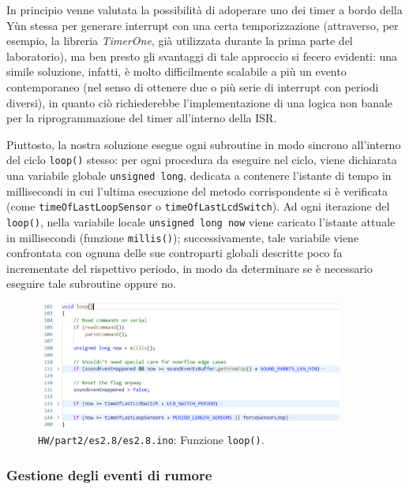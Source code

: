 \documentclass[12pt,a4paper]{article}
\begin{document}
In principio venne valutata la possibilità di adoperare uno dei timer a bordo della Yùn stessa per generare interrupt con una certa temporizzazione (attraverso, per esempio, la libreria \textit{TimerOne}, già utilizzata durante la prima parte del laboratorio), ma ben presto gli svantaggi di tale approccio si fecero evidenti: una simile soluzione, infatti, è molto difficilmente scalabile a più un evento contemporaneo (nel senso di ottenere due o più serie di interrupt con periodi diversi), in quanto ciò richiederebbe l'implementazione di una logica non banale per la riprogrammazione del timer all'interno della ISR.

Piuttosto, la nostra soluzione esegue ogni subroutine in modo sincrono all'interno del ciclo \verb|loop()| stesso: per ogni procedura da eseguire nel ciclo, viene dichiarata una variabile globale \verb|unsigned long|, dedicata a contenere l'istante di tempo in millisecondi in cui l'ultima esecuzione del metodo corrispondente si è verificata (come \verb|timeOfLastLoopSensor| o \verb|timeOfLastLcdSwitch|). Ad ogni iterazione del \verb|loop()|, nella variabile locale \verb|unsigned long now| viene caricato l'istante attuale in millisecondi (funzione \verb|millis()|); successivamente, tale variabile viene confrontata con ognuna delle sue controparti globali descritte poco fa incrementate del rispettivo periodo, in modo da determinare se è necessario eseguire tale subroutine oppure no.
\begin{figure}[h]
    \centering
    \includegraphics[width=0.9\textwidth]{loop_func.png}
    \caption*{\texttt{HW/part2/es2.8/es2.8.ino}: Funzione \texttt{loop()}.}
    \label{fig:loop_func}
\end{figure}
\subsubsection{Gestione degli eventi di rumore}
\end{document}
